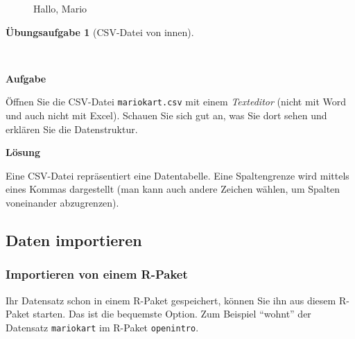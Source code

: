 \documentclass[
  a4paper,
]{scrbook}
\theoremstyle{definition}
\theoremstyle{definition}
\theoremstyle{definition}
\newtheorem{exercise}{Übungsaufgabe}[chapter]
\theoremstyle{remark}
\begin{document}
\begin{figure}


\caption{\label{fig-mario}Hallo, Mario}

\end{figure}%

\begin{exercise}[CSV-Datei von
innen]\protect\hypertarget{exr-texteditor}{}\label{exr-texteditor}

~

\textbf{Aufgabe}

Öffnen Sie die CSV-Datei \texttt{mariokart.csv} mit einem
\emph{Texteditor} (nicht mit Word und auch nicht mit Excel). Schauen Sie
sich gut an, was Sie dort sehen und erklären Sie die Datenstruktur.

\textbf{Lösung}

Eine CSV-Datei repräsentiert eine Datentabelle. Eine Spaltengrenze wird
mittels eines Kommas dargestellt (man kann auch andere Zeichen wählen,
um Spalten voneinander abzugrenzen).

\end{exercise}

\subsection{Daten importieren}\label{daten-importieren}

\subsubsection{Importieren von einem
R-Paket}\label{importieren-von-einem-r-paket}

Ihr Datensatz schon in einem R-Paket gespeichert, können Sie ihn aus
diesem R-Paket starten. Das ist die bequemste Option. Zum Beispiel
``wohnt'' der Datensatz \texttt{mariokart} im R-Paket
\texttt{openintro}.
\end{document}
